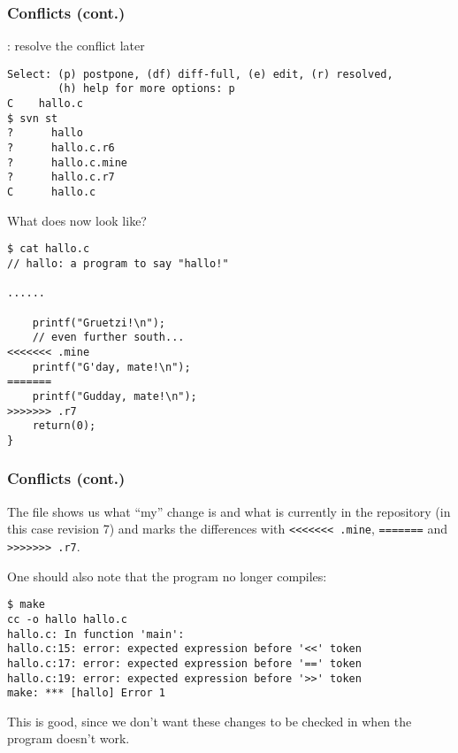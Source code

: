 \begin{frame}[fragile]
    \frametitle{Conflicts (cont.)}
    \linuxframe
\vspace*{-3mm}
: resolve the conflict later
\begin{lstlisting}[basicstyle=\tiny\ttfamily\color{black}]
Select: (p) postpone, (df) diff-full, (e) edit, (r) resolved,
        (h) help for more options: p
C    hallo.c
$ svn st
?      hallo
?      hallo.c.r6
?      hallo.c.mine
?      hallo.c.r7
C      hallo.c
\end{lstlisting}

What does  now look like?
\begin{lstlisting}[basicstyle=\tiny\ttfamily\color{black}]
$ cat hallo.c
// hallo: a program to say "hallo!"

......

    printf("Gruetzi!\n");
    // even further south...
<<<<<<< .mine
    printf("G'day, mate!\n");
=======
    printf("Gudday, mate!\n");
>>>>>>> .r7
    return(0);
}
\end{lstlisting}
\end{frame}

\begin{frame}[fragile]
    \frametitle{Conflicts (cont.)}
    \linuxframe

    The file shows us what \enquote{my} change is and what is currently in
    the repository (in this case revision 7) and marks the differences
    with \lstinline{<<<<<<< .mine}, \lstinline{=======} and
    \lstinline{>>>>>>> .r7}.

    One should also note that the program no longer compiles:
\begin{lstlisting}[basicstyle=\tiny\ttfamily\color{black}]
$ make
cc -o hallo hallo.c
hallo.c: In function 'main':
hallo.c:15: error: expected expression before '<<' token
hallo.c:17: error: expected expression before '==' token
hallo.c:19: error: expected expression before '>>' token
make: *** [hallo] Error 1
\end{lstlisting}
    This is good, since we don't want these changes to be checked in when
    the program doesn't work.
\end{frame}

